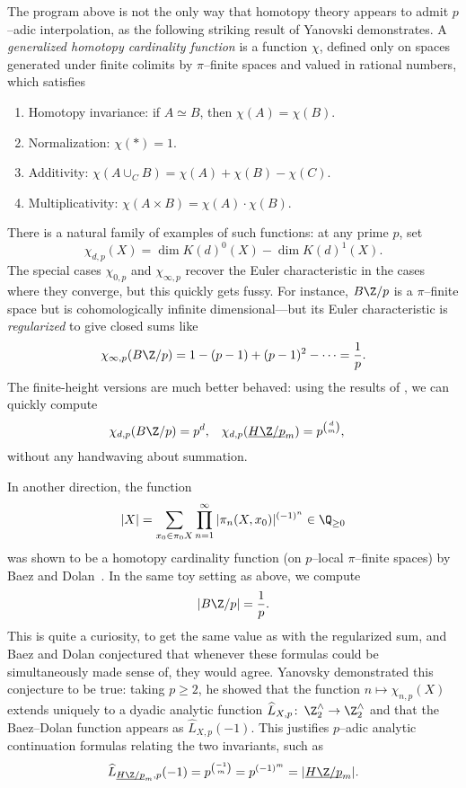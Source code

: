 The program above is not the only way that homotopy theory appears to admit \(p\)--adic interpolation, as the following striking result of Yanovski demonstrates.  A \textit{generalized homotopy cardinality function} is a function \(\chi\), defined only on spaces generated under finite colimits by \(\pi\)--finite spaces and valued in rational numbers, which satisfies
\begin{enumerate}
    \item Homotopy invariance: if \(A \simeq B\), then \(\chi(A) = \chi(B)\).
    \item Normalization: \(\chi(*) = 1\).
    \item Additivity: \(\chi(A \cup_C B) = \chi(A) + \chi(B) - \chi(C)\).
    \item Multiplicativity: \(\chi(A \times B) = \chi(A) \cdot \chi(B)\).
\end{enumerate}
There is a natural family of examples of such functions: at any prime \(p\), set \[\chi_{d,p}(X) = \dim K(d)^0(X) - \dim K(d)^1(X).\]  The special cases \(\chi_{0, p}\) and \(\chi_{\infty, p}\) recover the Euler characteristic in the cases where they converge, but this quickly gets fussy.  For instance, \(B\Z/p\) is a \(\pi\)--finite space but is cohomologically infinite dimensional---but its Euler characteristic is \textit{regularized} to give closed sums like \[\chi_{\infty, p}(B\Z/p) = 1 - (p-1) + (p-1)^2 - \cdots = \frac{1}{p}.\]  The finite-height versions are much better behaved: using the results of , we can quickly compute
\begin{align*}
\chi_{d,p}(B\Z/p) & = p^d, &
\chi_{d,p}(\OS{H\Z/p}{m}) & = p^{\binom{d}{m}},
\end{align*}
without any handwaving about summation.

In another direction, the function \[|X| = \sum_{x_0 \in \pi_0 X} \prod_{n=1}^\infty |\pi_n (X, x_0)|^{(-1)^n} \in \Q_{\ge 0}\] was shown to be a homotopy cardinality function (on \(p\)--local \(\pi\)--finite spaces) by Baez and Dolan~\cite{BaezDolan}.  In the same toy setting as above, we compute \[|B\Z/p| = \frac{1}{p}.\]  This is quite a curiosity, to get the same value as with the regularized sum, and Baez and Dolan conjectured that whenever these formulas could be simultaneously made sense of, they would agree.  Yanovsky demonstrated this conjecture to be true: taking \(p \ge 2\), he showed that the function \(n \mapsto \chi_{n, p}(X)\) extends uniquely to a dyadic analytic function \(\widehat L_{X,p}\co \Z^\wedge_2 \to \Z^\wedge_2\) and that the Baez--Dolan function appears as \(\widehat L_{X,p}(-1)\).  This justifies \(p\)--adic analytic continuation formulas relating the two invariants, such as \[\widehat L_{\OS{H\Z/p}{m}, p}(-1) = p^{\binom{-1}{m}} = p^{(-1)^m} = |\OS{H\Z/p}{m}|.\]







